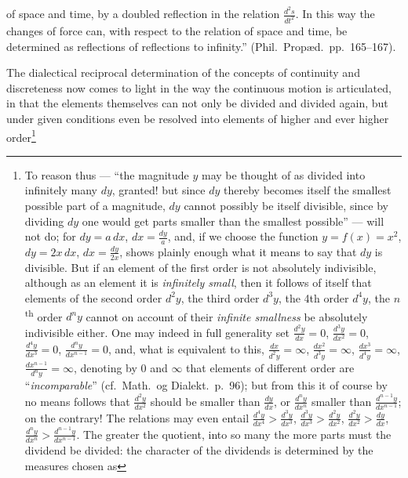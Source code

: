 \documentclass[12pt,a4paper]{book}
\begin{document}
\setcounter{footnote}{0}
of space and time, by a doubled reflection in the relation
$\frac{d^2s}{dt^2}$. In this way the changes of force can, with respect to the
relation of space and time, be determined as reflections of reflections to
infinity.'' (Phil.\ Propæd.\ pp.~165--167).

The dialectical reciprocal determination of the concepts of continuity and
discreteness now comes to light in the way the continuous motion is
articulated, in that the elements themselves can not only be divided and
divided again, but under given conditions even be
resolved into elements of higher and ever higher order\footnote{To reason
thus --- ``the magnitude $y$ may be thought of as divided into infinitely many
$dy$, granted! but since $dy$ thereby becomes itself the smallest possible part
of a magnitude, $dy$ cannot possibly be itself divisible, since by dividing
$dy$ one would get parts smaller than the smallest possible'' --- will not do;
for $dy = a\,dx$, $dx = \frac{dy}{a}$, and, if we choose the function
$y = f(x) = x^2$, $dy = 2x\,dx$, $dx = \frac{dy}{2x}$, shows plainly enough
what it means to say that $dy$ is divisible. But if an element of the first
order is not absolutely indivisible, although as an element it is
\emph{infinitely small}, then it follows of itself that elements of the second
order $d^2y$, the third order $d^3y$, the 4th order $d^4y$, the
$n$\textsuperscript{th} order $d^ny$ cannot on account of their
\emph{infinite smallness} be absolutely indivisible either. One may indeed in
full generality set $\frac{d^2y}{dx} = 0$, $\frac{d^3y}{dx^2} = 0$,
$\frac{d^4y}{dx^3} = 0$, $\frac{d^ny}{dx^{n-1}} = 0$, and, what is equivalent
to this, $\frac{dx}{d^2y} = \infty$,
$\frac{dx^2}{d^3y} = \infty$, $\frac{dx^3}{d^4y} = \infty$,
$\frac{dx^{n-1}}{d^ny} = \infty$, denoting by $0$ and
$\infty$ that elements of different order are
``\textit{incomparable}'' (cf.\ Math.\ og Dialekt.\ p.~96); but
from this it of course by no means follows that $\frac{d^2y}{dx^2}$
should be smaller than $\frac{dy}{dx}$, or $\frac{d^ny}{dx^n}$
smaller than $\frac{d^{n-1}y}{dx^{n-1}}$; on the contrary! The relations
may even entail $\frac{d^4y}{dx^4} > \frac{d^3y}{dx^3}$,
$\frac{d^3y}{dx^3} > \frac{d^2y}{dx^2}$,
$\frac{d^2y}{dx^2} > \frac{dy}{dx}$,
$\frac{d^ny}{dx^n} > \frac{d^{n-1}y}{dx^{n-1}}$. The greater
the quotient, into so many the more parts must the dividend be divided:
the character of the dividends is determined by the measures chosen as
}
\end{document}
